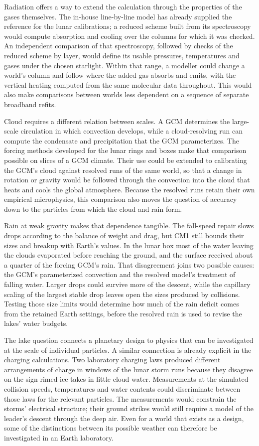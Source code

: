 Radiation offers a way to extend the calculation through the properties of the gases themselves. The in-house
line-by-line model has already supplied the reference for the lunar calibrations; a reduced scheme built from
its spectroscopy would compute absorption and cooling over the columns for which it was checked. An independent
comparison of that spectroscopy, followed by checks of the reduced scheme by layer, would define its usable
pressures, temperatures and gases under the chosen starlight. Within that range, a modeller could change a
world's column and follow where the added gas absorbs and emits, with the vertical heating computed from the
same molecular data throughout. This would also make comparisons between worlds less dependent on a sequence
of separate broadband refits.

Cloud requires a different relation between scales. A GCM determines the large-scale circulation in which
convection develops, while a cloud-resolving run can compute the condensate and precipitation that the GCM
parameterizes. The forcing methods developed for the lunar rings and boxes make that comparison possible on
slices of a GCM climate. Their use could be extended to calibrating the GCM's cloud against resolved runs of
the same world, so that a change in rotation or gravity would be followed through the convection into the cloud
that heats and cools the global atmosphere. Because the resolved runs retain their own empirical microphysics,
this comparison also moves the question of accuracy down to the particles from which the cloud and rain form.

Rain at weak gravity makes that dependence tangible. The fall-speed repair slows drops according to the balance
of weight and drag, but CM1 still bounds their sizes and breakup with Earth's values. In the lunar box most of
the water leaving the clouds evaporated before reaching the ground, and the surface received about a quarter
of the forcing GCM's rain. That disagreement joins two possible causes: the GCM's parameterized convection and
the resolved model's treatment of falling water. Larger drops could survive more of the descent, while the
capillary scaling of the largest stable drop leaves open the sizes produced by collisions. Testing those size
limits would determine how much of the rain deficit comes from the retained Earth settings, before the resolved
rain is used to revise the lakes' water budgets.

The lake question connects a planetary design to physics that can be investigated at the scale of individual
particles. A similar connection is already explicit in the charging calculations. Two laboratory charging laws
produced different arrangements of charge in windows of the lunar storm runs because they disagree on the sign
rimed ice takes in little cloud water. Measurements at the simulated collision speeds, temperatures and water
contents could discriminate between those laws for the relevant particles. The measurements would constrain
the storms' electrical structure; their ground strikes would still require a model of the leader's descent
through the deep air. Even for a world that exists as a design, some of the distinctions between its possible
weather can therefore be investigated in an Earth laboratory.

